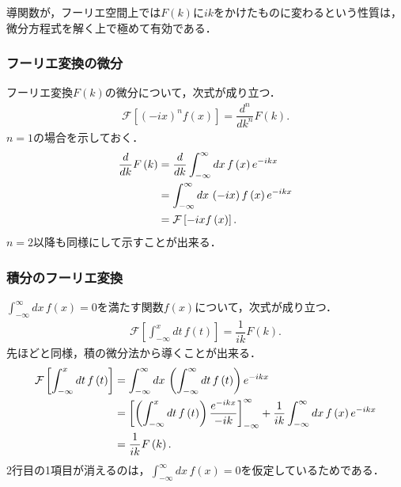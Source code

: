 導関数が，フーリエ空間上では$F(k)$に$ik$をかけたものに変わるという性質は，
微分方程式を解く上で極めて有効である．
%
\subsubsection{フーリエ変換の微分}
%

フーリエ変換$F(k)$の微分について，次式が成り立つ．
\begin{align}
 \mathcal{F}\left[\left(-ix\right)^{n}f\left(x\right)\right] = \dfrac{d^n}{dk^n}F\left(k\right). 
\end{align}
%
$n=1$の場合を示しておく．
\begin{align}
  \dfrac{d}{dk}F\left(k\right)
  &= \dfrac{d}{dk}\int_{-\infty}^{\infty}dx\,f\left(x\right)e^{-ikx} \notag \\
  &= \int_{-\infty}^{\infty}dx\, \left(-ix\right)f\left(x\right)e^{-ikx} \notag \\
  &= \mathcal{F}\left[-ixf\left(x\right)\right].
\end{align}
$n=2$以降も同様にして示すことが出来る．
%
\subsubsection{積分のフーリエ変換}
%
$\int_{-\infty}^{\infty}dx\,f\left(x\right) = 0$を満たす関数$f(x)$について，次式が成り立つ．
%
\begin{align}
 \mathcal{F}\left[\int_{-\infty}^{x} dt\, f\left(t\right)\right] = \dfrac{1}{ik}F\left(k\right).
\end{align}
%
先ほどと同様，積の微分法から導くことが出来る．
\begin{align}
 \mathcal{F}\left[\int_{-\infty}^{x}dt\,f\left(t\right)\right] 
& = \int_{-\infty}^{\infty}dx\,\left(\int_{-\infty}^{\infty}dt\,f\left(t\right)\right) e^{-ikx} \notag \\
& = \left[\left(\int_{-\infty}^{x}dt\,f\left(t\right)\right)\dfrac{e^{-ikx}}{-ik}\right]_{-\infty}^{\infty}
    + \dfrac{1}{ik}\int_{-\infty}^{\infty}dx\, f\left(x\right)e^{-ikx} \notag \\
& = \dfrac{1}{ik}F\left(k\right). 
\end{align}
2行目の1項目が消えるのは，$\int_{-\infty}^{\infty}dx\,f\left(x\right) = 0$を仮定しているためである．
%
